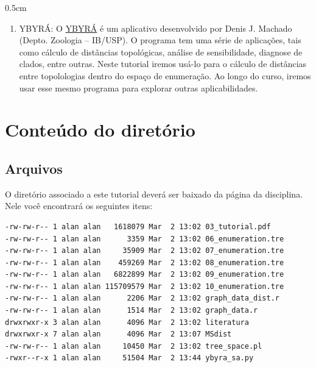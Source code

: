 \begin{refsection}
\begin {myindentpar}{0.5cm}
\begin{enumerate}[\itshape i.]
	\item{YBYRÁ:}\label{tut3:require:ybyra} O \href{http://www.ib.usp.br/grant/anfibios/researchSoftware.html/}{YBYRÁ} \parencite{Machado_2014} é um aplicativo desenvolvido por Denis J. Machado (Depto. Zoologia -- IB/USP). O programa tem uma série de aplicações, tais como cálculo de distâncias topológicas, análise de sensibilidade, diagnose de clados, entre outras. Neste tutorial iremos usá-lo para o cálculo de distâncias entre topolologias dentro do espaço de enumeração. Ao longo do curso, iremos usar esse mesmo programa para explorar outras aplicabilidades.


\end{enumerate}
\end{myindentpar}


\section{Conteúdo do diretório}\label{tut3:containt}

\subsection{Arquivos}\label{tut3:containt:arq}
	O diretório associado a este tutorial deverá ser baixado da página da disciplina. Nele você encontrará os seguintes itens:\\

\begin{lstlisting}[label=tut3:ls1]
-rw-rw-r-- 1 alan alan   1618079 Mar  2 13:02 03_tutorial.pdf
-rw-rw-r-- 1 alan alan      3359 Mar  2 13:02 06_enumeration.tre
-rw-rw-r-- 1 alan alan     35909 Mar  2 13:02 07_enumeration.tre
-rw-rw-r-- 1 alan alan    459269 Mar  2 13:02 08_enumeration.tre
-rw-rw-r-- 1 alan alan   6822899 Mar  2 13:02 09_enumeration.tre
-rw-rw-r-- 1 alan alan 115709579 Mar  2 13:02 10_enumeration.tre
-rw-rw-r-- 1 alan alan      2206 Mar  2 13:02 graph_data_dist.r
-rw-rw-r-- 1 alan alan      1514 Mar  2 13:02 graph_data.r
drwxrwxr-x 3 alan alan      4096 Mar  2 13:02 literatura
drwxrwxr-x 7 alan alan      4096 Mar  2 13:07 MSdist
-rw-rw-r-- 1 alan alan     10450 Mar  2 13:02 tree_space.pl
-rwxr--r-x 1 alan alan     51504 Mar  2 13:44 ybyra_sa.py
\end{lstlisting}


\end{refsection}
